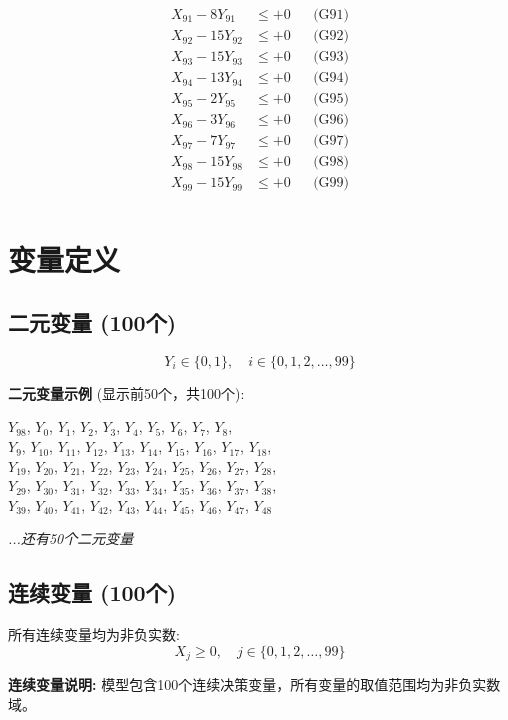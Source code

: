 \documentclass[a4paper,10pt]{article}
\begin{document}
{\begin{align}
X_{91} - 8Y_{91} &\leq +0 && \text{(G91)} \\
X_{92} - 15Y_{92} &\leq +0 && \text{(G92)} \\
X_{93} - 15Y_{93} &\leq +0 && \text{(G93)} \\
X_{94} - 13Y_{94} &\leq +0 && \text{(G94)} \\
X_{95} - 2Y_{95} &\leq +0 && \text{(G95)} \\
X_{96} - 3Y_{96} &\leq +0 && \text{(G96)} \\
X_{97} - 7Y_{97} &\leq +0 && \text{(G97)} \\
X_{98} - 15Y_{98} &\leq +0 && \text{(G98)} \\
X_{99} - 15Y_{99} &\leq +0 && \text{(G99)} \\
\end{align}
}

\section{变量定义}

\subsection{二元变量 (100个)}

\begin{equation}
Y_i \in \{0,1\}, \quad i \in \{0, 1, 2, \ldots, 99\}
\end{equation}

\textbf{二元变量示例} (显示前50个，共100个):

{\small
$Y_{98}$, $Y_{0}$, $Y_{1}$, $Y_{2}$, $Y_{3}$, $Y_{4}$, $Y_{5}$, $Y_{6}$, $Y_{7}$, $Y_{8}$, \\
$Y_{9}$, $Y_{10}$, $Y_{11}$, $Y_{12}$, $Y_{13}$, $Y_{14}$, $Y_{15}$, $Y_{16}$, $Y_{17}$, $Y_{18}$, \\
$Y_{19}$, $Y_{20}$, $Y_{21}$, $Y_{22}$, $Y_{23}$, $Y_{24}$, $Y_{25}$, $Y_{26}$, $Y_{27}$, $Y_{28}$, \\
$Y_{29}$, $Y_{30}$, $Y_{31}$, $Y_{32}$, $Y_{33}$, $Y_{34}$, $Y_{35}$, $Y_{36}$, $Y_{37}$, $Y_{38}$, \\
$Y_{39}$, $Y_{40}$, $Y_{41}$, $Y_{42}$, $Y_{43}$, $Y_{44}$, $Y_{45}$, $Y_{46}$, $Y_{47}$, $Y_{48}$

\textit{...还有50个二元变量}
}

\subsection{连续变量 (100个)}

所有连续变量均为非负实数:
\begin{equation}
X_j \geq 0, \quad j \in \{0, 1, 2, \ldots, 99\}
\end{equation}

\textbf{连续变量说明:} 模型包含100个连续决策变量，所有变量的取值范围均为非负实数域。
\end{document}
